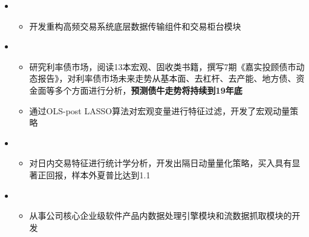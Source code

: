   \begin{itemize}[leftmargin=*]
    \item
      {\small
      \begin{itemize}
        \item 开发重构高频交易系统底层数据传输组件和交易柜台模块
      \end{itemize}
      }
    \item
      {\small
      \begin{itemize}
        \item 研究利率债市场，阅读13本宏观、固收类书籍，撰写7期《嘉实投顾债市动态报告》，对利率债市场未来走势从基本面、去杠杆、去产能、地方债、资金面等多个方面进行分析，\textbf{预测债牛走势将持续到19年底}
        \item 通过OLS-post LASSO算法对宏观变量进行特征过滤，开发了宏观动量策略
      \end{itemize}
      }
    \item
      {\small
      \begin{itemize}
        \item 对日内交易特征进行统计学分析，开发出隔日动量量化策略，买入具有显著正回报，样本外夏普比达到1.1
      \end{itemize}
      }
    \item
      {\small
      \begin{itemize}
        \item 从事公司核心企业级软件产品内数据处理引擎模块和流数据抓取模块的开发
      \end{itemize}
      }
  \end{itemize}